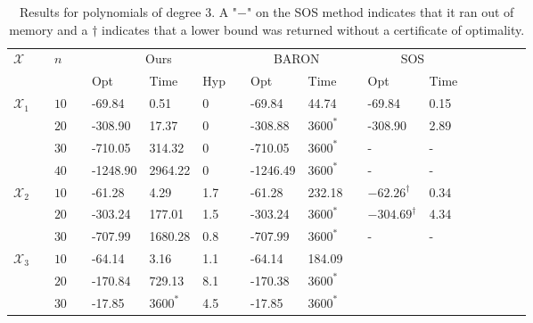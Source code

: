 \documentclass[opre,nonblindrev]{informs3} %
\begin{document}
\begin{table}[H]   
    \centering 
    \begin{tabular}{lcllllllllllllllll}
    \hline 
    \multirow{2}{*}{$\mathcal{X}$} & & \multirow{2}{*}{$n$} & &  \multicolumn{3}{c}{Ours} &  & \multicolumn{2}{c}{BARON} & & \multicolumn{2}{c}{SOS} \\
		\cline{5-7} \cline{9-10} \cline{12-13} 
    	& & &  & Opt & Time & Hyp &  & Opt & Time & & Opt & Time \\ \hline \hline 
        \multirow{4}{*}{$\mathcal{X}_1$} & & $10$ & & -69.84 & 0.51 & 0 & & -69.84 & 44.74 & & -69.84 & 0.15 \\
        & & $20$ & & -308.90 & 17.37 & 0 & & -308.88 & $3600^{*}$ & & -308.90 & 2.89 \\
        & & $30$ & & -710.05 & 314.32 & 0 & & -710.05 & $3600^{*}$ & & - & - \\ 
        & & $40$ & & -1248.90 & 2964.22 & 0 & & -1246.49 & $3600^{*}$ & & - & - \\
	\hline 
        \multirow{3}{*}{$\mathcal{X}_2$} & & $10$ & & -61.28 & 4.29 & 1.7 & & -61.28 & 232.18 & & $-62.26^{\dag}$ & 0.34 \\
        & & $20$ & & -303.24 & 177.01 & 1.5 & & -303.24 & $3600^{*}$ & & $-304.69^{\dag}$ & 4.34 \\
        & & $30$ & & -707.99 & 1680.28 & 0.8 & & -707.99 & $3600^{*}$ & & - & - \\ 
        \hline 
        \multirow{3}{*}{$\mathcal{X}_3$} & & $10$ & & -64.14 & 3.16 & 1.1 & & -64.14 & 184.09 & &  &  \\
        & & $20$ & & -170.84 & 729.13 & 8.1 & & -170.38 & $3600^{*}$ & &  &  \\
        & & $30$ & & -17.85 & $3600^{*}$ & 4.5 & & -17.85 & $3600^{*}$ & &  &  \\ 
        \hline 
    \end{tabular} 
    \caption{Results for polynomials of degree 3. A "$-$" on the SOS method indicates that it ran out of memory and a $\dag$ indicates that a lower bound was returned without a certificate of optimality. \label{tab:results_degree3}}
\end{table} 
\end{document}
